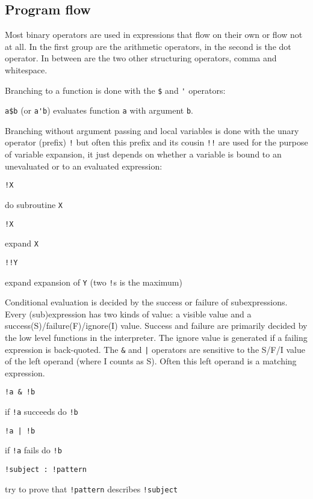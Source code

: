 \documentclass[12pt]{article}
\begin{document}
\subsection{Program flow}

Most binary operators are used in expressions that flow on their own
or flow not at all. In the first group are the arithmetic operators,
in the second is the dot operator. In between are the two other
structuring operators, comma and whitespace.

Branching to a function is done with the \verb|$| and \verb|'|
operators:

\verb|a$b| (or \verb|a'b|) evaluates function \verb|a| with argument
\verb|b|.

Branching without argument passing and local variables is done with
the unary operator (prefix) \verb|!| but often this prefix and its
cousin \verb|!!| are used for the purpose of variable expansion, it
just depends on whether a variable is bound to an unevaluated or to an
evaluated expression:
\begin{description}
\item \verb|!X|\par
  do subroutine \verb|X|
\item \verb|!X|\par
  expand \verb|X|
\item \verb|!!Y|\par
  expand expansion of \verb|Y| (two \verb|!|s is the maximum)
\end{description}

Conditional evaluation is decided by the success or failure of
subexpressions. Every (sub)expression has two kinds of value: a
visible value and a success(S)/failure(F)/ignore(I) value. Success and
failure are primarily decided by the low level functions in the
interpreter. The ignore value is generated if a failing expression is
back-quoted. The \verb|&| and \verb,|, operators are sensitive to the
S/F/I value of the left operand (where I counts as S). Often this left
operand is a matching expression.
\begin{description}
\item \verb|!a & !b|\par
  if \verb|!a| succeeds do \verb|!b|
\item \verb,!a | !b,\par
  if \verb|!a| fails do \verb|!b|
\item \verb|!subject : !pattern|\par
  try to prove that \verb|!pattern| describes \verb|!subject|
\end{description}
\end{document}
